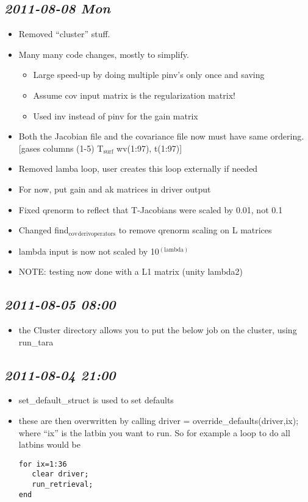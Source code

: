 \documentclass[11pt]{article}
\begin{document}
\subsection{\textit{2011-08-08 Mon}}
\label{sec-2_3}


\begin{itemize}
\item Removed ``cluster'' stuff.
\item Many many code changes, mostly to simplify.
\begin{itemize}
\item Large speed-up by doing multiple pinv's only once and saving
\item Assume cov input matrix is the regularization matrix!
\item Used inv instead of pinv for the gain matrix
\end{itemize}
\item Both the Jacobian file and the covariance file now must have same
  ordering.  [gases columns (1-5) T$_{\mathrm{surf}}$ wv(1:97), t(1:97)]
\item Removed lamba loop, user creates this loop externally if needed
\item For now, put gain and ak matrices in driver output
\item Fixed qrenorm to reflect that T-Jacobians were scaled by 0.01, not
  0.1
\item Changed find$_{\mathrm{cov}}$$_{\mathrm{derivoperators}}$ to remove qrenorm scaling on L matrices
\item lambda input is now not scaled by 10$^{\mathrm{(lambda)}}$
\item NOTE: testing now done with a L1 matrix (unity lambda2)
\end{itemize}
\subsection{\textit{2011-08-05 08:00}}
\label{sec-2_4}


\begin{itemize}
\item the Cluster directory allows you to put the below job on the
  cluster, using run\_tara
\end{itemize}
\subsection{\textit{2011-08-04 21:00}}
\label{sec-2_5}


\begin{itemize}
\item set\_default\_struct is used to set defaults
\item these are then overwritten by calling driver =
  override\_defaults(driver,ix); where ``ix'' is the latbin you want to
  run.  So for example a loop to do all latbins would be 
\begin{verbatim}
for ix=1:36
   clear driver; 
   run_retrieval; 
end
\end{verbatim}
\end{itemize}
\end{document}
